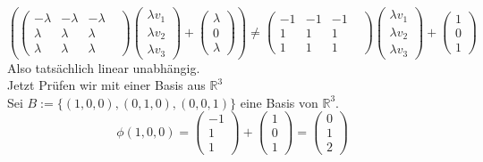 \documentclass[10pt,a4paper]{article}
\begin{document}
$$
\left(\begin{pmatrix}
-\lambda&-\lambda&-\lambda&\\\lambda&\lambda&\lambda&\\\lambda&\lambda&\lambda&
\end{pmatrix} 
\begin{pmatrix}\lambda v_1\\\lambda v_2\\\lambda v_3\end{pmatrix}
 +\begin{pmatrix}
\lambda\\0\\\lambda\end{pmatrix}\right)
\neq 
\begin{pmatrix}
-1&-1&-1&\\1&1&1&\\1&1&1&
\end{pmatrix} 
\begin{pmatrix}\lambda v_1\\\lambda v_2\\\lambda v_3\end{pmatrix}
 +\begin{pmatrix}
1\\0\\1\end{pmatrix}
$$ 
Also tatsächlich linear unabhängig.\\
Jetzt Prüfen wir mit einer Basis aus $\mathbb{R}^3$\\
Sei $B:=\{(1,0,0),(0,1,0),(0,0,1) \}$ eine Basis von $\mathbb{R}^3$.\\
$$ 
\phi(1,0,0) = 
\begin{pmatrix}-1\\1\\1 \end{pmatrix}+
\begin{pmatrix}1\\0\\1 \end{pmatrix} =
\begin{pmatrix} 0\\1\\2 \end{pmatrix}
$$
\end{document}
